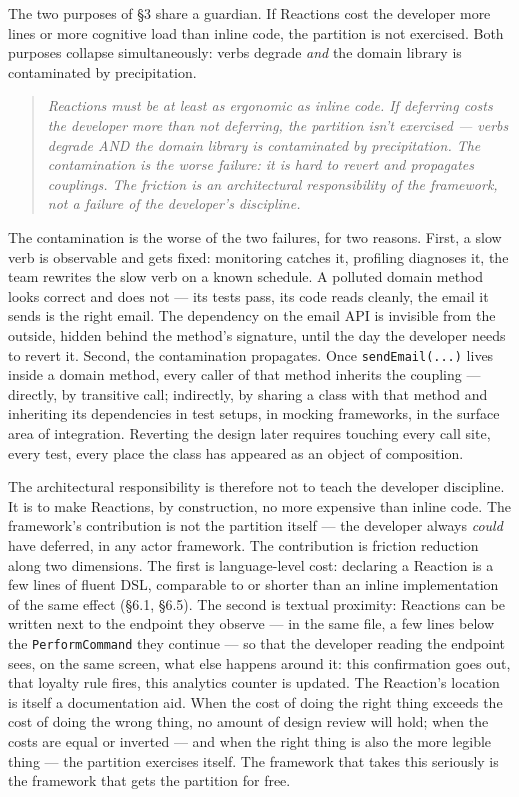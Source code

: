 \documentclass[
]{article}
\let\origtexttt\texttt%
\renewcommand{\texttt}[1]{\origtexttt{\seqsplit{#1}}}%
\let\texttt\origtexttt%
\begin{document}
The two purposes of §3 share a guardian. If Reactions cost the developer
more lines or more cognitive load than inline code, the partition is not
exercised. Both purposes collapse simultaneously: verbs degrade
\emph{and} the domain library is contaminated by precipitation.

\begin{quote}
\emph{Reactions must be at least as ergonomic as inline code. If
deferring costs the developer more than not deferring, the partition
isn't exercised --- verbs degrade AND the domain library is contaminated
by precipitation. The contamination is the worse failure: it is hard to
revert and propagates couplings. The friction is an architectural
responsibility of the framework, not a failure of the developer's
discipline.}
\end{quote}

The contamination is the worse of the two failures, for two reasons.
First, a slow verb is observable and gets fixed: monitoring catches it,
profiling diagnoses it, the team rewrites the slow verb on a known
schedule. A polluted domain method looks correct and does not --- its
tests pass, its code reads cleanly, the email it sends is the right
email. The dependency on the email API is invisible from the outside,
hidden behind the method's signature, until the day the developer needs
to revert it. Second, the contamination propagates. Once
\texttt{sendEmail(...)} lives inside a domain method, every caller of
that method inherits the coupling --- directly, by transitive call;
indirectly, by sharing a class with that method and inheriting its
dependencies in test setups, in mocking frameworks, in the surface area
of integration. Reverting the design later requires touching every call
site, every test, every place the class has appeared as an object of
composition.

The architectural responsibility is therefore not to teach the developer
discipline. It is to make Reactions, by construction, no more expensive
than inline code. The framework's contribution is not the partition
itself --- the developer always \emph{could} have deferred, in any actor
framework. The contribution is friction reduction along two dimensions.
The first is language-level cost: declaring a Reaction is a few lines of
fluent DSL, comparable to or shorter than an inline implementation of
the same effect (§6.1, §6.5). The second is textual proximity: Reactions
can be written next to the endpoint they observe --- in the same file, a
few lines below the \texttt{PerformCommand} they continue --- so that
the developer reading the endpoint sees, on the same screen, what else
happens around it: this confirmation goes out, that loyalty rule fires,
this analytics counter is updated. The Reaction's location is itself a
documentation aid. When the cost of doing the right thing exceeds the
cost of doing the wrong thing, no amount of design review will hold;
when the costs are equal or inverted --- and when the right thing is
also the more legible thing --- the partition exercises itself. The
framework that takes this seriously is the framework that gets the
partition for free.
\end{document}
